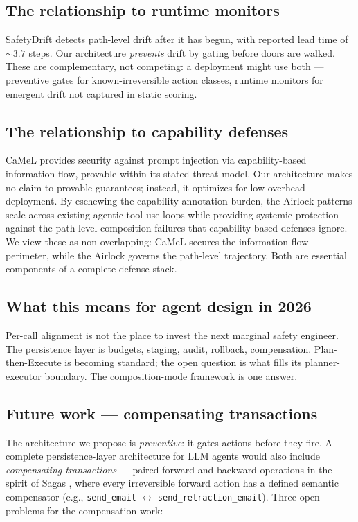 \documentclass[11pt]{article}
\begin{document}
\subsection{The relationship to runtime monitors}

SafetyDrift detects path-level drift after it has begun, with reported lead time of ${\sim}3.7$ steps. Our architecture \emph{prevents} drift by gating before doors are walked. These are complementary, not competing: a deployment might use both --- preventive gates for known-irreversible action classes, runtime monitors for emergent drift not captured in static scoring.

\subsection{The relationship to capability defenses}

CaMeL provides security against prompt injection via capability-based information flow, provable within its stated threat model. Our architecture makes no claim to provable guarantees; instead, it optimizes for low-overhead deployment. By eschewing the capability-annotation burden, the Airlock patterns scale across existing agentic tool-use loops while providing systemic protection against the path-level composition failures that capability-based defenses ignore. We view these as non-overlapping: CaMeL secures the information-flow perimeter, while the Airlock governs the path-level trajectory. Both are essential components of a complete defense stack.

\subsection{What this means for agent design in 2026}

Per-call alignment is not the place to invest the next marginal safety engineer. The persistence layer is budgets, staging, audit, rollback, compensation. Plan-then-Execute is becoming standard; the open question is what fills its planner-executor boundary. The composition-mode framework is one answer.

\subsection{Future work --- compensating transactions}

The architecture we propose is \emph{preventive}: it gates actions before they fire. A complete persistence-layer architecture for LLM agents would also include \emph{compensating transactions} --- paired forward-and-backward operations in the spirit of Sagas \citep{garcia1987sagas}, where every irreversible forward action has a defined semantic compensator (e.g., \texttt{send\_email} $\leftrightarrow$ \texttt{send\_retraction\_email}). Three open problems for the compensation work:
\end{document}
